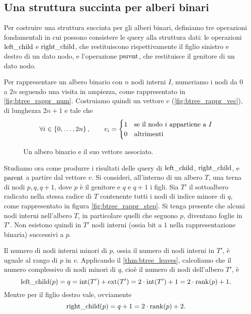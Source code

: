 \subsection{Una struttura succinta per alberi binari}
Per costruire una struttura succinta per gli alberi binari, definiamo tre operazioni fondamentali in cui possono consistere le query alla struttura dati: le operazioni $\mathrm{left\_child}$ e $\mathrm{right\_child}$, che restituiscono rispettivamente il figlio sinistro e destro di un dato nodo, e l'operazione $\mathrm{parent}$, che restituisce il genitore di un dato nodo.

Per rappresentare un albero binario con $n$ nodi interni $I$, numeriamo i nodi da $0$ a $2n$ seguendo una visita in ampiezza, come rappresentato in \cref{fig:btree_rappr_num}.
Costruiamo quindi un vettore $v$ (\cref{fig:btree_rappr_vec}), di lunghezza $2n+1$ e tale che
\begin{equation*}
	\forall i\in\left\{ 0,\dots,2n \right\},\qquad v_i = \begin{cases}
		1 & \text{se il nodo $i$ appartiene a $I$} \\
		0 & \text{altrimenti}
	\end{cases}
\end{equation*}

\begin{figure}
	\centering
	
	\caption{Un albero binario e il suo vettore associato.}
\end{figure}

Studiamo ora come produrre i risultati delle query di $\mathrm{left\_child}$, $\mathrm{right\_child}$, e $\mathrm{parent}$ a partire dal vettore $v$.
Si consideri, all'interno di un albero $T$, una terna di nodi $p,q,q+1$, dove $p$ è il genitore e $q$ e $q+1$ i figli.
Sia $T'$ il sottoalbero radicato nella stessa radice di $T$ contenente tutti i nodi di indice minore di $q$, come rappresentato in figura \ref{fig:btree_rappr_step}.
Si tenga presente che alcuni nodi interni nell'albero $T$, in particolare quelli che seguono $p$, diventano foglie in $T'$.
Non esistono quindi in $T'$ nodi interni (ossia bit a $1$ nella rappresentazione binaria) successivi a $p$.

Il numero di nodi interni minori di $p$, ossia il numero di nodi interni in $T'$, è uguale al rango di $p$ in $v$. Applicando il \cref{thm:btree_leaves}, calcoliamo che il numero complessivo di nodi minori di $q$, cioè il numero di nodi dell'albero $T'$, è
\begin{equation}\label{eq:btree:left_child}
	\mathrm{left\_child}(p) = q = \mathrm{int}(T')+\mathrm{ext}(T') = 2\cdot\mathrm{int}(T')+1 = 2\cdot\mathrm{rank}(p)+1 \text.
\end{equation}
Mentre per il figlio destro vale, ovviamente
\begin{equation}\label{eq:btree:right_child}
	\mathrm{right\_child}(p) = q+1 = 2\cdot\mathrm{rank}(p)+2 \text.
\end{equation}


